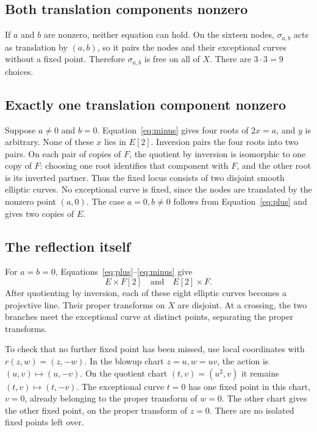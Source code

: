 \documentclass[11pt]{amsart}
\theoremstyle{definition}
\begin{document}
\subsection{Both translation components nonzero}
If $a$ and $b$ are nonzero, neither equation can hold. On the sixteen
nodes, $\sigma_{a,b}$ acts as translation by $(a,b)$, so it pairs the
nodes and their exceptional curves without a fixed point. Therefore
$\sigma_{a,b}$ is free on all of $X$. There are $3\cdot3=9$ choices.

\subsection{Exactly one translation component nonzero}
Suppose $a\ne0$ and $b=0$. Equation~\eqref{eq:minus} gives four roots
of $2x=a$, and $y$ is arbitrary. None of these $x$ lies in $E[2]$.
Inversion pairs the four roots into two pairs. On each pair of copies
of $F$, the quotient by inversion is isomorphic to one copy of $F$:
choosing one root identifies that component with $F$, and the other
root is its inverted partner. Thus the fixed locus consists of two
disjoint smooth elliptic curves. No exceptional curve is fixed, since
the nodes are translated by the nonzero point $(a,0)$.
The case $a=0,b\ne0$ follows from Equation~\eqref{eq:plus} and gives
two copies of $E$.

\subsection{The reflection itself}
For $a=b=0$, Equations~\eqref{eq:plus}--\eqref{eq:minus} give
\[
 E\times F[2]\quad\text{and}\quad E[2]\times F.
\]
After quotienting by inversion, each of these eight elliptic curves
becomes a projective line. Their proper transforms on $X$ are disjoint.
At a crossing, the two branches meet the exceptional curve at distinct
points, separating the proper transforms.

To check that no further fixed point has been missed, use local
coordinates with $r(z,w)=(z,-w)$. In the blowup chart $z=u,w=uv$,
the action is $(u,v)\mapsto(u,-v)$. On the quotient chart
$(t,v)=(u^2,v)$ it remains $(t,v)\mapsto(t,-v)$. The exceptional
curve $t=0$ has one fixed point in this chart, $v=0$, already belonging
to the proper transform of $w=0$. The other chart gives the other
fixed point, on the proper transform of $z=0$. There are no isolated
fixed points left over.
\end{document}
